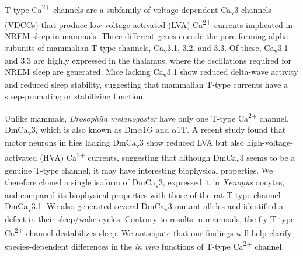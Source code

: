 T-type Ca\textsuperscript{2+} channels are a subfamily of voltage-dependent Ca\textsubscript{v}3 channels (VDCCs) that produce low-voltage-activated (LVA) Ca\textsuperscript{2+} currents implicated in NREM sleep in mammals\cite{Lee:2004ey}.
Three different genes encode the pore-forming alpha subunits of mammalian T-type channels, Ca\textsubscript{v}3.1, 3.2, and 3.3. Of these, Ca\textsubscript{v}3.1 and 3.3 are highly expressed in the thalamus, where the oscillations required for NREM sleep are generated\cite{PerezReyes:1998gn}.
Mice lacking Ca\textsubscript{v}3.1 show reduced delta-wave activity and reduced sleep stability, suggesting that mammalian T-type currents have a sleep-promoting or stabilizing function\cite{Lee:2004ey}.

Unlike mammals, \emph{Drosophila melanogaster} have only one T-type Ca\textsuperscript{2+} channel, DmCa\textsubscript{v}3, which is also known as Dm$\alpha$1G and $\alpha$1T.
A recent study found that motor neurons in flies lacking DmCa\textsubscript{v}3 show reduced LVA but also high-voltage-activated (HVA) Ca\textsuperscript{2+} currents, suggesting that although DmCa\textsubscript{v}3 seems to be a genuine T-type channel, it may have interesting biophysical properties\cite{Ryglewski:2012jk}.
We therefore cloned a single isoform of DmCa\textsubscript{v}3,  expressed it in \emph{Xenopus} oocytes, and compared its biophysical properties with those of the rat T-type channel DmCa\textsubscript{v}3.1.
We also generated several DmCa\textsubscript{v}3 mutant alleles and identified a defect in their sleep/wake cycles. Contrary to results in mammals, the fly T-type Ca\textsuperscript{2+} channel destabilizes sleep.
We anticipate that our findings will help clarify species-dependent differences in the \emph{in vivo} functions of T-type Ca\textsuperscript{2+} channel.